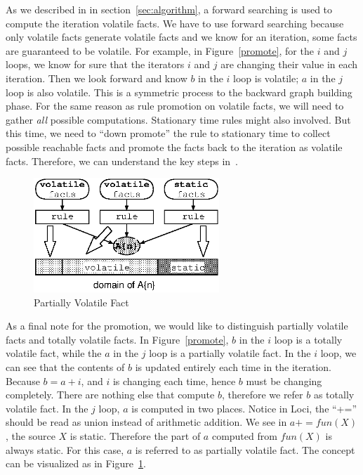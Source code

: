 \documentclass{article}
\begin{document}
As we described in  in
section~\ref{sec:algorithm}, a forward searching is used to compute
the iteration volatile facts. We have to use forward searching because
only volatile facts generate volatile facts and we know for an
iteration, some facts are guaranteed to be volatile. For example, in
Figure~\ref{promote}, for the $i$ and $j$ loops, we know for sure that
the iterators $i$ and $j$ are changing their value in each
iteration. Then we look forward and know $b$ in the $i$ loop is
volatile; $a$ in the $j$ loop is also volatile. This is a symmetric
process to the backward graph building phase. For the same reason as
rule promotion on volatile facts, we will need to gather {\it all}
possible computations. Stationary time rules might also involved. But
this time, we need to ``down promote'' the rule to stationary time to
collect possible reachable facts and promote the facts back to the
iteration as volatile facts. Therefore, we can understand the key
steps in~. 

\begin{figure}[htbp]
  \begin{center}
    \includegraphics[width=2.75in]{volatility}
    \caption{Partially Volatile Fact}
    \label{pvolatile}
  \end{center}
\end{figure}

As a final note for the promotion, we would like to distinguish
partially volatile facts and totally volatile facts. In
Figure~\ref{promote}, $b$ in the $i$ loop is a totally volatile fact,
while the $a$ in the $j$ loop is a partially volatile fact. In the $i$
loop, we can see that the contents of $b$ is updated entirely each
time in the iteration. Because $b=a+i$, and $i$ is changing each time,
hence $b$ must be changing completely. There are nothing else that
compute $b$, therefore we refer $b$ as totally volatile fact. In the
$j$ loop, $a$ is computed in two places. Notice in Loci, the
``+='' should be read as union instead of arithmetic addition. We see in
$a+=fun(X)$, the source $X$ is static. Therefore the part of $a$
computed from $fun(X)$ is always static. For this case, $a$ is
referred to as partially volatile fact. The concept can be visualized
as in Figure~\ref{pvolatile}. 
\end{document}
